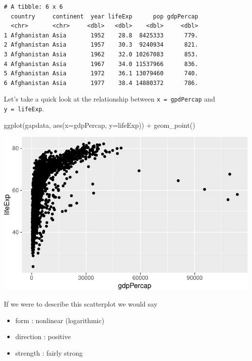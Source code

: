 \documentclass[
  letterpaper,
  DIV=11,
  numbers=noendperiod]{scrreprt}
\newenvironment{Shaded}{\begin{snugshade}}{\end{snugshade}}
\newcommand{\AttributeTok}[1]{\textcolor[rgb]{0.40,0.45,0.13}{#1}}
\newcommand{\FunctionTok}[1]{\textcolor[rgb]{0.28,0.35,0.67}{#1}}
\newcommand{\NormalTok}[1]{\textcolor[rgb]{0.00,0.23,0.31}{#1}}
\newcommand{\SpecialCharTok}[1]{\textcolor[rgb]{0.37,0.37,0.37}{#1}}
\providecommand{\tightlist}{%
  \setlength{\itemsep}{0pt}\setlength{\parskip}{0pt}}\usepackage{longtable,booktabs,array}
\begin{document}
\begin{verbatim}
# A tibble: 6 x 6
  country     continent  year lifeExp      pop gdpPercap
  <chr>       <chr>     <dbl>   <dbl>    <dbl>     <dbl>
1 Afghanistan Asia       1952    28.8  8425333      779.
2 Afghanistan Asia       1957    30.3  9240934      821.
3 Afghanistan Asia       1962    32.0 10267083      853.
4 Afghanistan Asia       1967    34.0 11537966      836.
5 Afghanistan Asia       1972    36.1 13079460      740.
6 Afghanistan Asia       1977    38.4 14880372      786.
\end{verbatim}

Let's take a quick look at the relationship between
\texttt{x\ =\ gpdPercap} and \texttt{y\ =\ lifeExp}.

\begin{Shaded}
\begin{Highlighting}[]
\FunctionTok{ggplot}\NormalTok{(gapdata, }\FunctionTok{aes}\NormalTok{(}\AttributeTok{x=}\NormalTok{gdpPercap, }\AttributeTok{y=}\NormalTok{lifeExp)) }\SpecialCharTok{+}
  \FunctionTok{geom\_point}\NormalTok{()}
\end{Highlighting}
\end{Shaded}

\includegraphics{Advanced_Scatterplot_Techniques_files/figure-pdf/unnamed-chunk-14-1.pdf}

If we were to describe this scatterplot we would say

\begin{itemize}
\tightlist
\item
  form : nonlinear (logarithmic)
\item
  direction : positive
\item
  strength : fairly strong
\end{itemize}
\end{document}
